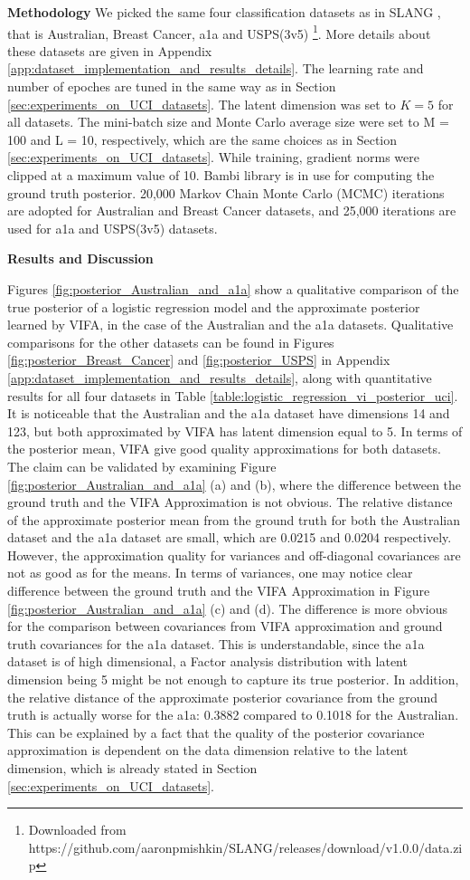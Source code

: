 \documentclass[10pt]{article} %
\begin{document}
\textbf{Methodology} We picked the same four classification datasets as in SLANG \cite{mishkin2018}, that is Australian, Breast Cancer, a1a and USPS(3v5) \footnote{Downloaded from https://github.com/aaronpmishkin/SLANG/releases/download/v1.0.0/data.zip}. More details about these datasets are given in Appendix \ref{app:dataset_implementation_and_results_details}. The learning rate and number of epoches are tuned in the same way as in Section \ref{sec:experiments_on_UCI_datasets}. The latent dimension was set to $K = 5$ for all datasets. The mini-batch size and
Monte Carlo average size were set to M = 100 and L = 10, respectively, which are the same choices as in Section \ref{sec:experiments_on_UCI_datasets}. While training, gradient norms were clipped at a maximum value of 10. Bambi library \cite{Capretto2022} is in use for computing the ground truth posterior. 20,000 Markov Chain Monte Carlo (MCMC) iterations are adopted for Australian and Breast Cancer datasets, and 25,000 iterations are used for a1a and USPS(3v5) datasets.


\textbf{Results and Discussion}

Figures \ref{fig:posterior_Australian_and_a1a} show a qualitative comparison of the true posterior of a logistic regression model and the approximate posterior learned by VIFA, in the case of the Australian and the a1a datasets.  Qualitative comparisons for the other datasets can be found in Figures \ref{fig:posterior_Breast_Cancer} and \ref{fig:posterior_USPS} in Appendix \ref{app:dataset_implementation_and_results_details}, along with quantitative results for all four datasets in Table \ref{table:logistic_regression_vi_posterior_uci}. It is noticeable that the Australian and the a1a dataset have dimensions 14 and 123, but both approximated by VIFA has latent dimension equal to 5. In terms of the posterior mean, VIFA give good quality approximations for both datasets. The claim can be validated by examining Figure \ref{fig:posterior_Australian_and_a1a} (a) and (b), where the difference between the ground truth and the VIFA Approximation is not obvious. The relative distance of the approximate posterior mean from the ground truth for both the Australian dataset and the a1a dataset are small, which are 0.0215 and 0.0204 respectively. However, the approximation quality for variances and off-diagonal covariances are not as good as for the means. In terms of variances, one may notice clear difference between the ground truth and the VIFA Approximation in Figure \ref{fig:posterior_Australian_and_a1a} (c) and (d). The difference is more obvious for the comparison between covariances from VIFA approximation and ground truth covariances for the a1a dataset. This is understandable, since the a1a dataset is of high dimensional, a Factor analysis distribution with latent dimension being 5 might be not enough to capture its true posterior. In addition, the relative distance of the approximate posterior covariance from the ground truth is actually worse for the a1a: 0.3882 compared to 0.1018 for the Australian. 
This can be explained by a fact that the quality of the posterior covariance approximation is dependent on the data dimension relative to the latent dimension, which is already stated in Section \ref{sec:experiments_on_UCI_datasets}.
\end{document}
